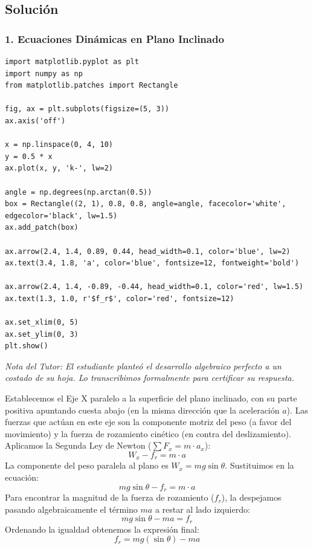 \documentclass[12pt, a4paper]{article}
\begin{document}
\subsection*{Solución}

\subsubsection*{1. Ecuaciones Dinámicas en Plano Inclinado}

\begin{verbatim}
import matplotlib.pyplot as plt
import numpy as np
from matplotlib.patches import Rectangle

fig, ax = plt.subplots(figsize=(5, 3))
ax.axis('off')

x = np.linspace(0, 4, 10)
y = 0.5 * x
ax.plot(x, y, 'k-', lw=2)

angle = np.degrees(np.arctan(0.5))
box = Rectangle((2, 1), 0.8, 0.8, angle=angle, facecolor='white', edgecolor='black', lw=1.5)
ax.add_patch(box)

ax.arrow(2.4, 1.4, 0.89, 0.44, head_width=0.1, color='blue', lw=2)
ax.text(3.4, 1.8, 'a', color='blue', fontsize=12, fontweight='bold')

ax.arrow(2.4, 1.4, -0.89, -0.44, head_width=0.1, color='red', lw=1.5)
ax.text(1.3, 1.0, r'$f_r$', color='red', fontsize=12)

ax.set_xlim(0, 5)
ax.set_ylim(0, 3)
plt.show()
\end{verbatim}

\textit{Nota del Tutor: El estudiante planteó el desarrollo algebraico perfecto a un costado de su hoja. Lo transcribimos formalmente para certificar su respuesta.}

Establecemos el Eje X paralelo a la superficie del plano inclinado, con su parte positiva apuntando cuesta abajo (en la misma dirección que la aceleración $a$).
Las fuerzas que actúan en este eje son la componente motriz del peso (a favor del movimiento) y la fuerza de rozamiento cinético (en contra del deslizamiento).
Aplicamos la Segunda Ley de Newton ($\sum F_x = m \cdot a_x$):
$$ W_x - f_r = m \cdot a $$
La componente del peso paralela al plano es $W_x = mg \sin\theta$. Sustituimos en la ecuación:
$$ mg \sin\theta - f_r = m \cdot a $$
Para encontrar la magnitud de la fuerza de rozamiento ($f_r$), la despejamos pasando algebraicamente el término $ma$ a restar al lado izquierdo:
$$ mg \sin\theta - ma = f_r $$
Ordenando la igualdad obtenemos la expresión final:
$$ f_r = mg (\sin\theta) - ma $$
\end{document}
